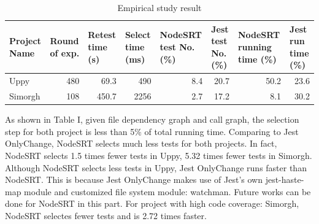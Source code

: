 \documentclass[10pt, conference]{IEEEtran}
\begin{document}
\begin{table}[htbp]
    \caption{Empirical study result}
    \centering
    \begin{tabular}{@{}p{2em}p{2.2em}p{2em}p{1.8em}p{3.5em}p{2em}p{3.5em}p{3em}@{}}
    \toprule
    \textbf{Project Name} & \textbf{Round of exp.}  & \textbf{Retest time (s)}           & \textbf{Select time (ms)} & \textbf{NodeSRT test No. (\%)}    & \textbf{Jest test No. (\%)}       & \textbf{NodeSRT running time (\%)} & \textbf{Jest run time (\%)} \\ \midrule
    Uppy         & \multicolumn{1}{r}{480} & \multicolumn{1}{r}{69.3}  & \multicolumn{1}{r}{490} & \multicolumn{1}{r}{8.4} & \multicolumn{1}{r}{20.7} & \multicolumn{1}{r}{50.2}  &   \multicolumn{1}{r}{23.6} \\ 
    Simorgh      & \multicolumn{1}{r}{108} & \multicolumn{1}{r}{450.7} & \multicolumn{1}{r}{2256} & \multicolumn{1}{r}{2.7}& \multicolumn{1}{r}{17.2} & \multicolumn{1}{r}{8.1}   &  \multicolumn{1}{r}{30.2} \\ \bottomrule
    \end{tabular}
    \end{table}

As shown in Table I, given file dependency graph and call graph, the selection step for both project is less than 5\% of total 
running time. Comparing to Jest OnlyChange, NodeSRT selects much less tests for both projects. In fact, NodeSRT selects 1.5 times fewer 
tests in Uppy, 5.32 times fewer tests in Simorgh. Although NodeSRT selects less tests in Uppy, Jest OnlyChange runs faster than NodeSRT. 
This is because Jest OnlyChange makes use of Jest's own jest-haste-map module and customized file system module: watchman. Future works can 
be done for NodeSRT in this part. For project with high code coverage: Simorgh, NodeSRT selectes fewer tests and is 2.72 times faster. 
\end{document}

